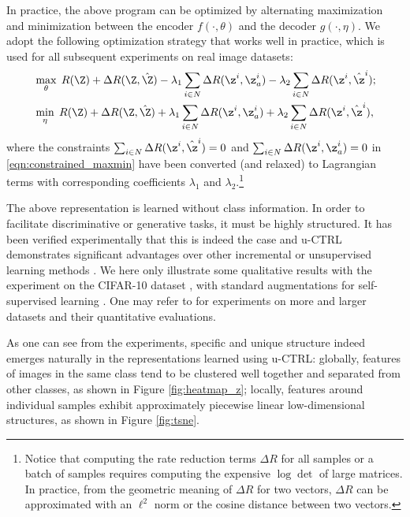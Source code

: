\documentclass[../../book-main.tex]{subfiles}
\begin{document}
In practice, the above program can be optimized by alternating maximization and minimization between the encoder $f(\cdot,\theta)$ and the decoder $g(\cdot,\eta)$. We adopt the following optimization strategy that works well in practice, which is used for all subsequent experiments on real image datasets:
\vspace{-1mm}
\begin{align}
  &  \max_{\theta}\; R(\Z) + \Delta{R(\Z, \hat{\Z})-\lambda_{1}\sum_{i\in N} \Delta R(\z^i, \z_{a}^i)} -\lambda_{2}\sum_{i\in N} \Delta R(\z^i, \hat{\z}^i) \label{eqn:constrained_max}; \\
   & \min_{\eta}\; R(\Z) + \Delta{R(\Z, \hat{\Z})+\lambda_{1}\sum_{i\in N} \Delta R(\z^i, \z_{a}^i)+ \lambda_{2}\sum_{i\in N} \Delta R(\z^i, \hat{\z}^i)} \label{eqn:constrained_min}, 
\end{align}
where the constraints $\sum_{i\in N} \Delta R(\z^i, \hat{\z}^i) = 0$ and $\sum_{i\in N} \Delta R(\z^i, \z_{a}^i) = 0$ in \eqref{eqn:constrained_maxmin} have been converted (and relaxed) to Lagrangian terms with corresponding coefficients $\lambda_{1}$ and  $\lambda_{2}$.\footnote{Notice that computing the rate reduction terms $\Delta R$ for all samples or a batch of samples requires computing the expensive $\log\det$ of large matrices. In practice, from the geometric meaning of $\Delta R$ for two vectors, $\Delta R$ can be approximated with an $\ell^2$ norm or the cosine distance between two vectors.}

The above representation is learned without class information. In order to facilitate discriminative or generative tasks, it must be highly structured. It has been verified experimentally that this is indeed the case and u-CTRL demonstrates significant advantages over other incremental or unsupervised learning methods \cite{pmlr-v234-tong24a}. We here only illustrate some qualitative results with the experiment on the CIFAR-10 dataset \cite{krizhevsky2014cifar}, with standard augmentations for self-supervised learning \cite{chen2020simple}. One may refer to \cite{pmlr-v234-tong24a} for experiments on more and larger datasets and their quantitative evaluations. 

As one can see from the experiments, specific and unique structure indeed emerges naturally in the representations learned using u-CTRL: globally, features of images in the same class tend to be clustered well together and separated from other classes, as shown in Figure \ref{fig:heatmap_z}; locally, features around individual samples exhibit approximately piecewise linear low-dimensional structures, as shown in Figure \ref{fig:tsne}. 
\end{document}
